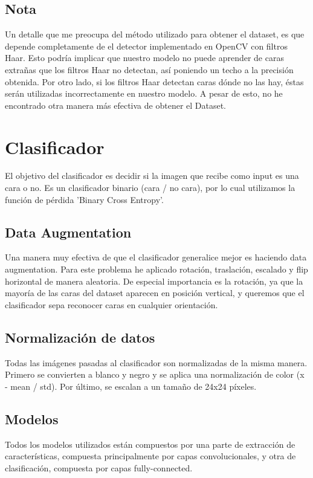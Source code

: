 \documentclass[a4paper, 11pt]{article}
\begin{document}
		\subsection{Nota}
		Un detalle que me preocupa del método utilizado para obtener el dataset, es que depende completamente de el detector implementado en OpenCV con filtros Haar. Esto podría implicar que nuestro modelo no puede aprender de caras extrañas que los filtros Haar no detectan, así poniendo un techo a la precisión obtenida. Por otro lado, si los filtros Haar detectan caras dónde no las hay, éstas serán utilizadas incorrectamente en nuestro modelo. A pesar de esto, no he encontrado otra manera más efectiva de obtener el Dataset.
	\section{Clasificador}
		El objetivo del clasificador\cite{classifier-training} es decidir si la imagen que recibe como input es una cara o no. Es un clasificador binario (cara / no cara), por lo cual utilizamos la función de pérdida 'Binary Cross Entropy'.
		
		\subsection{Data Augmentation}
			Una manera muy efectiva de que el clasificador generalice mejor es haciendo data augmentation. Para este problema he aplicado rotación, traslación, escalado y flip horizontal de manera aleatoria. De especial importancia es la rotación, ya que la mayoría de las caras del dataset aparecen en posición vertical, y queremos que el clasificador sepa reconocer caras en cualquier orientación.
			
		\subsection{Normalización de datos}
			Todas las imágenes pasadas al clasificador son normalizadas de la misma manera. Primero se convierten a blanco y negro y se aplica una normalización de color (x - mean / std). Por último, se escalan a un tamaño de 24x24 píxeles.

		\subsection{Modelos}
			Todos los modelos utilizados están compuestos por una parte de extracción de características, compuesta principalmente por capas convolucionales, y otra de clasificación, compuesta por capas fully-connected.  \\
			
\end{document}

